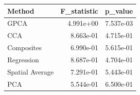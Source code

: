 \begin{tabular}{lrr}
\toprule
Method & F_statistic & p_value \\
\midrule
GPCA & 4.991e+00 & 7.537e-03 \\
CCA & 8.663e-01 & 4.715e-01 \\
Composites & 6.990e-01 & 5.615e-01 \\
Regression & 8.687e-01 & 4.704e-01 \\
Spatial Average & 7.291e-01 & 5.443e-01 \\
PCA & 5.544e-01 & 6.500e-01 \\
\bottomrule
\end{tabular}
